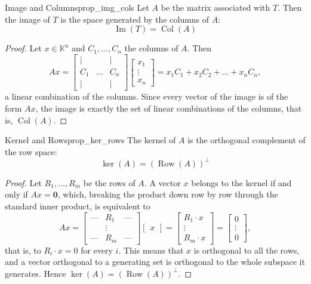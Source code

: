 \documentclass[11pt, a4paper]{article}
\begin{document}
\begin{proposicion}{Image and Columns}{prop_img_cols}
Let $A$ be the matrix associated with $T$. Then the image of $T$ is the space generated by the columns of $A$:
\[ \operatorname{Im}(T) = \operatorname{Col}(A) \]
\end{proposicion}

\begin{proof}
Let $x \in \mathbb{K}^n$ and $C_1, \dots, C_n$ the columns of $A$. Then
\[
Ax = \begin{bmatrix} | & & | \\ C_1 & \dots & C_n \\ | & & | \end{bmatrix} \begin{bmatrix} x_1 \\ \vdots \\ x_n \end{bmatrix} = x_1 C_1 + x_2 C_2 + \dots + x_n C_n,
\]
a linear combination of the columns. Since every vector of the image is of the form $Ax$, the image is exactly the set of linear combinations of the columns, that is, $\operatorname{Col}(A)$.
\end{proof}

\begin{proposicion}{Kernel and Rows}{prop_ker_rows}
The kernel of $A$ is the orthogonal complement of the row space:
\[ \ker(A) = (\operatorname{Row}(A))^\perp \]
\end{proposicion}

\begin{proof}
Let $R_1, \dots, R_m$ be the rows of $A$. A vector $x$ belongs to the kernel if and only if $Ax = \mathbf{0}$, which, breaking the product down row by row through the standard inner product, is equivalent to
\[
Ax = \begin{bmatrix} \text{---} & R_1 & \text{---} \\ & \vdots & \\ \text{---} & R_m & \text{---} \end{bmatrix} \begin{bmatrix} x \end{bmatrix} = \begin{bmatrix} R_1 \cdot x \\ \vdots \\ R_m \cdot x \end{bmatrix} = \begin{bmatrix} 0 \\ \vdots \\ 0 \end{bmatrix},
\]
that is, to $R_i \cdot x = 0$ for every $i$. This means that $x$ is orthogonal to all the rows, and a vector orthogonal to a generating set is orthogonal to the whole subspace it generates. Hence $\ker(A) = (\operatorname{Row}(A))^\perp$.
\end{proof}
\end{document}
